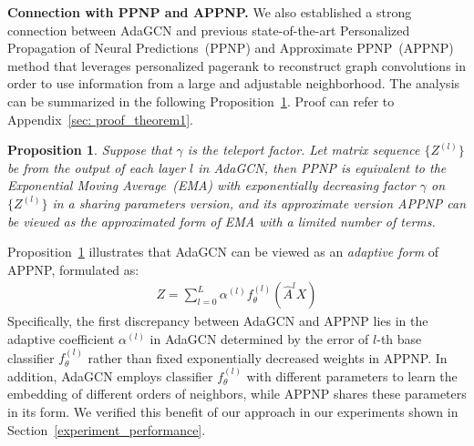 \documentclass{article} \usepackage{iclr2021_conference,times}
\newtheorem{prop}{Proposition}
\begin{document}
\textbf{Connection with PPNP and APPNP.} We also established a strong connection between AdaGCN and previous state-of-the-art Personalized Propagation of Neural Predictions~(PPNP) and Approximate PPNP~(APPNP)~\citep{klicpera2018predict} method that leverages personalized pagerank to reconstruct graph convolutions in order to use information from a large and adjustable neighborhood. The analysis can be summarized in the following Proposition~\ref{theorem:PPNP}. Proof can refer to Appendix~\ref{sec: proof_theorem1}.

\begin{prop}\label{theorem:PPNP}
	Suppose that $\gamma$ is the teleport factor. Let matrix sequence $\{Z^{(l)}\}$ be from the output of each layer $l$ in AdaGCN, then PPNP is equivalent to the Exponential Moving Average~(EMA) with exponentially decreasing factor $\gamma$ on $\{Z^{(l)}\}$ in a sharing parameters version, and its approximate version APPNP can be viewed as the approximated form of EMA with a limited number of terms.
\end{prop}

Proposition~\ref{theorem:PPNP} illustrates that AdaGCN can be viewed as an \textit{adaptive form} of APPNP, formulated as:
\begin{equation}  
\label{eq_AdaGCN_equivalent}
\begin{aligned} 
Z=\sum_{l=0}^{L}\alpha^{(l)}f_{\theta}^{(l)}(\hat{A}^l X)
\end{aligned} 
\end{equation}
Specifically, the first discrepancy between AdaGCN and APPNP lies in the adaptive coefficient $\alpha^{(l)}$ in AdaGCN determined by the error of $l$-th base classifier $f_{\theta}^{(l)}$ rather than fixed exponentially decreased weights in APPNP. In addition, AdaGCN employs classifier $f_{\theta}^{(l)}$ with different parameters to learn the embedding of different orders of neighbors, while APPNP shares these parameters in its form. We verified this benefit of our approach in our experiments shown in Section~\ref{experiment_performance}.
\end{document}
